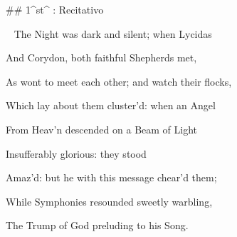 ## 1^st^ \mvmt: Recitativo

\
\beginnumbering
\pstart
The Night was dark and silent; when Lycidas 

And Corydon, both faithful Shepherds met, 

As wont to meet each other; and watch their flocks, 

Which lay about them cluster’d: when an Angel 

From Heav’n descended on a Beam of Light 

Insufferably glorious: they stood 

Amaz’d: but he with this message chear’d them; 

While Symphonies resounded sweetly warbling, 

The Trump of God preluding to his Song.
\pend
\endnumbering

